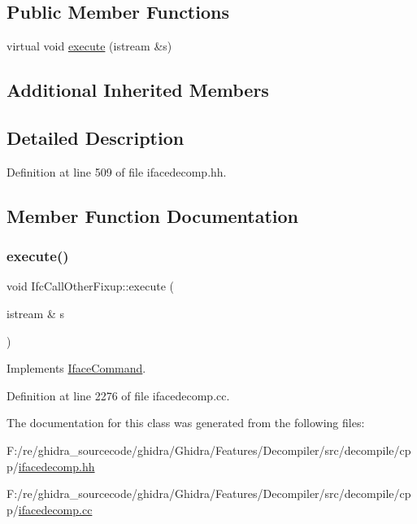 \subsection*{Public Member Functions}
\begin{DoxyCompactItemize}
\item 
virtual void \mbox{\hyperlink{class_ifc_call_other_fixup_aec285f15002efa5a47ee620114ef6150}{execute}} (istream \&s)
\end{DoxyCompactItemize}
\subsection*{Additional Inherited Members}


\subsection{Detailed Description}


Definition at line 509 of file ifacedecomp.\+hh.



\subsection{Member Function Documentation}
\mbox{\label{class_ifc_call_other_fixup_aec285f15002efa5a47ee620114ef6150}} 
\subsubsection{\texorpdfstring{execute()}{execute()}}
{\footnotesize\ttfamily void Ifc\+Call\+Other\+Fixup\+::execute (\begin{DoxyParamCaption}\item[{istream \&}]{s }\end{DoxyParamCaption})\hspace{0.3cm}{\ttfamily [virtual]}}



Implements \mbox{\hyperlink{class_iface_command_af10e29cee2c8e419de6efe9e680ad201}{Iface\+Command}}.



Definition at line 2276 of file ifacedecomp.\+cc.



The documentation for this class was generated from the following files\+:\begin{DoxyCompactItemize}
\item 
F\+:/re/ghidra\+\_\+sourcecode/ghidra/\+Ghidra/\+Features/\+Decompiler/src/decompile/cpp/\mbox{\hyperlink{ifacedecomp_8hh}{ifacedecomp.\+hh}}\item 
F\+:/re/ghidra\+\_\+sourcecode/ghidra/\+Ghidra/\+Features/\+Decompiler/src/decompile/cpp/\mbox{\hyperlink{ifacedecomp_8cc}{ifacedecomp.\+cc}}\end{DoxyCompactItemize}
